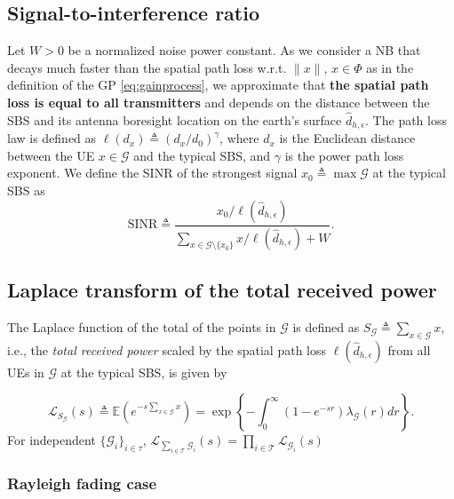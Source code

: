 \documentclass[conference]{IEEEtran}
\theoremstyle{definition}
\theoremstyle{plain}
\begin{document}
          \subsection{Signal-to-interference ratio}
          Let $W>0$ be a normalized noise power constant. As we consider a NB that decays much faster than the spatial path loss w.r.t. $\|x\|$, $x \in \Phi$ as in the definition of the GP \eqref{eq:gainprocess}, we approximate that \textbf{the spatial path loss is equal to all transmitters} and depends on the distance between the SBS and its antenna boresight location on the earth's surface $\hat{d}_{h,\epsilon}$. The path loss law is defined as $\ell({d_x}) \triangleq ({d_x}/d_0)^{\gamma}$, where $d_x$ is the Euclidean distance between the UE $x \in \mathcal{G}$ and the typical SBS, and $\gamma$ is the power path loss exponent. We define the SINR of the strongest signal $x_0 \triangleq \max  \mathcal{G}$ at the typical SBS as
          \begin{equation}
            \text{SINR} \triangleq \frac{x_0/\ell(\hat{d}_{h,\epsilon})}{\sum\limits_{x \in \mathcal{G} \setminus \{x_0\}}x/\ell(\hat{d}_{h,\epsilon})+ W}.
          \end{equation}

          \subsection{Laplace transform of the total received power}

          The Laplace function of the total of the points in $\mathcal{G}$ is defined as $S_{\mathcal{G}} \triangleq \sum_{x \in \mathcal{G}}x$, i.e., the \textit{total received power} scaled by the spatial path loss $\ell(\hat{d}_{h,\epsilon})$ from all UEs in $\mathcal{G}$ at the typical SBS, is given by

          \begin{equation}
            \label{eq:lapdef}
            \mathcal{L}_{S_{\mathcal{G}}}(s)\triangleq \mathbb{E}\left(e^{-s\sum\limits_{x \in \mathcal{G}}x}\right)= \exp\left\{-\int_0^{\infty}(1-e^{-sr}) \lambda_{\mathcal{G}}(r) dr \right\}.
          \end{equation}
          For independent $\{\mathcal{G}_i\}_{i \in \mathcal{\tau}}$, $\mathcal{L}_{\sum_{i \in \mathcal{T}} \mathcal{G}_i}(s) = \prod_{i \in \mathcal{T}} \mathcal{L}_{\mathcal{G}_i}(s)$

          
          \subsubsection{Rayleigh fading case}
          
\end{document}
